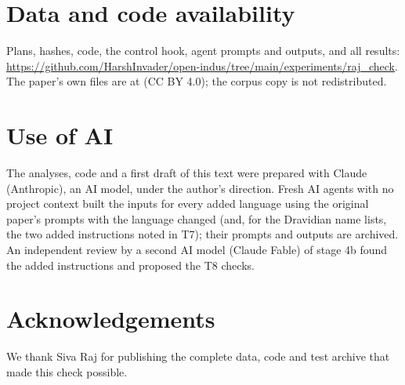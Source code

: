 \documentclass[11pt,a4paper]{article}
\begin{document}
\section*{Data and code availability}
Plans, hashes, code, the control hook, agent prompts and outputs, and all results: \url{https://github.com/HarshInvader/open-indus/tree/main/experiments/raj_check}. The paper's own files are at \citet{raj2026} (CC BY 4.0); the corpus copy is not redistributed.

\section*{Use of AI}
The analyses, code and a first draft of this text were prepared with Claude (Anthropic), an AI model, under the author's direction. Fresh AI agents with no project context built the inputs for every added language using the original paper's prompts with the language changed (and, for the Dravidian name lists, the two added instructions noted in T7); their prompts and outputs are archived. An independent review by a second AI model (Claude Fable) of stage 4b found the added instructions and proposed the T8 checks.

\section*{Acknowledgements}
We thank Siva Raj for publishing the complete data, code and test archive that made this check possible.



\end{document}
